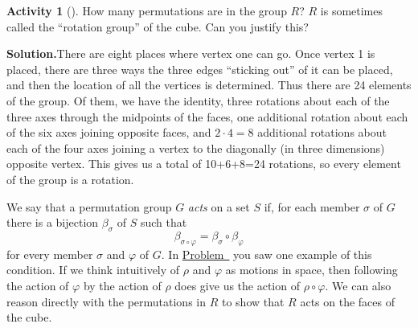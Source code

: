 \documentclass[10pt,]{book}
\theoremstyle{plain}
\theoremstyle{definition}
\newtheorem{activity}[project]{Activity}
\numberwithin{equation}{chapter}
\begin{document}
\begin{activity}[]\label{activity-278}
How many permutations are in the group \(R\)? \(R\) is sometimes called the ``rotation group'' of the cube. Can you justify this?%
\par\medskip\noindent%
\textbf{Solution.}\quad There are eight places where vertex one can go. Once vertex 1 is placed, there are three ways the three edges ``sticking out'' of it can be placed, and then the location of all the vertices is determined. Thus there are 24 elements of the group. Of them, we have the identity, three rotations about each of the three axes through the midpoints of the faces, one additional rotation about each of the six axes joining opposite faces, and \(2\cdot4=8\) additional rotations about each of the four axes joining a vertex to the diagonally (in three dimensions) opposite vertex. This gives us a total of 10+6+8=24 rotations, so every element of the group is a rotation.%
\end{activity}
We say that a permutation group \(G\) \emph{acts} on a set \(S\) if, for each member \(\sigma\) of \(G\) there is a bijection \(\beta_{\sigma}\) of \(S\) such that%
\begin{equation*}
\beta_{\sigma\circ\varphi} = \beta_{\sigma}\circ\beta_{\varphi}
\end{equation*}
for every member \(\sigma\) and \(\varphi\) of \(G\). In \hyperref[cube2]{Problem~} you saw one example of this condition. If we think intuitively of \(\rho\) and \(\varphi\) as motions in space, then following the action of \(\varphi\) by the action of \(\rho\) does give us the action of \(\rho\circ\varphi\). We can also reason directly with the permutations in \(R\) to show that \(R\) acts on the faces of the cube.%
\end{document}

